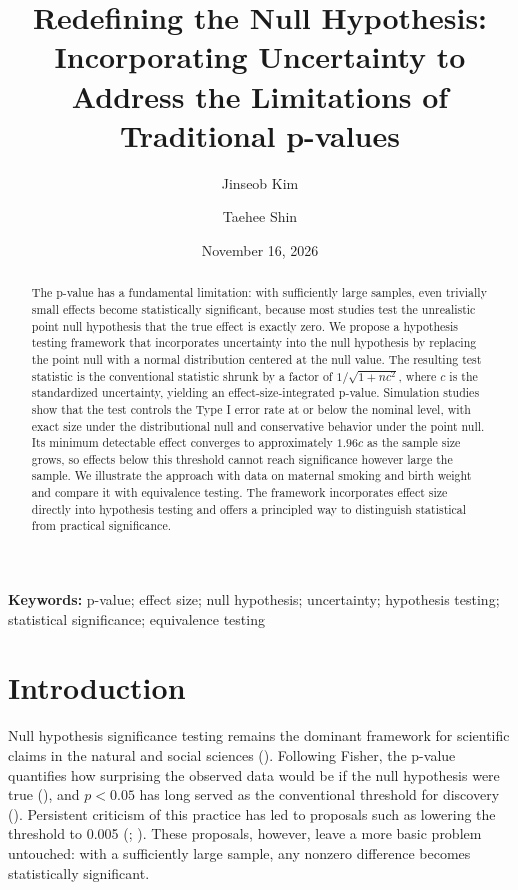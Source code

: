 \documentclass[
  11pt,
  letterpaper,
]{article}
\author[1,*]{Jinseob Kim}
\author[1,2]{Taehee Shin}
\affil[1]{Zarathu Co., Ltd., Seoul, South Korea}
\affil[2]{Department of Applied Statistics, Yonsei University, Seoul, South Korea}
\affil[*]{Corresponding author: \protect\href{mailto:jinseob2kim@gmail.com}{jinseob2kim@gmail.com}}
\title{Redefining the Null Hypothesis: Incorporating Uncertainty to
Address the Limitations of Traditional p-values}
\author{}
\date{November 16, 2026}
\begin{document}
\maketitle
\begin{abstract}
The p-value has a fundamental limitation: with sufficiently large
samples, even trivially small effects become statistically significant,
because most studies test the unrealistic point null hypothesis that the
true effect is exactly zero. We propose a hypothesis testing framework
that incorporates uncertainty into the null hypothesis by replacing the
point null with a normal distribution centered at the null value. The
resulting test statistic is the conventional statistic shrunk by a
factor of \(1/\sqrt{1+nc^2}\), where \(c\) is the standardized
uncertainty, yielding an effect-size-integrated p-value. Simulation
studies show that the test controls the Type I error rate at or below
the nominal level, with exact size under the distributional null and
conservative behavior under the point null. Its minimum detectable
effect converges to approximately \(1.96c\) as the sample size grows, so
effects below this threshold cannot reach significance however large the
sample. We illustrate the approach with data on maternal smoking and
birth weight and compare it with equivalence testing. The framework
incorporates effect size directly into hypothesis testing and offers a
principled way to distinguish statistical from practical significance.
\end{abstract}

\noindent\textbf{Keywords:} p-value; effect size; null hypothesis; uncertainty; hypothesis testing; statistical significance; equivalence testing
\bigskip


\section{Introduction}\label{sec-intro}

Null hypothesis significance testing remains the dominant framework for
scientific claims in the natural and social sciences
(). Following
Fisher, the p-value quantifies how surprising the observed data would be
if the null hypothesis were true (),
and \(p < 0.05\) has long served as the conventional threshold for
discovery ().
Persistent criticism of this practice has led to proposals such as
lowering the threshold to 0.005 (; ). These
proposals, however, leave a more basic problem untouched: with a
sufficiently large sample, any nonzero difference becomes statistically
significant.
\end{document}
